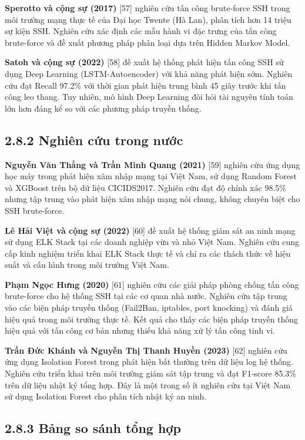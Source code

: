 \documentclass[
  a4paper]{report}
\begin{document}
\textbf{Sperotto và cộng sự (2017)} {[}57{]} nghiên cứu tấn công
brute-force SSH trong môi trường mạng thực tế của Đại học Twente (Hà
Lan), phân tích hơn 14 triệu sự kiện SSH. Nghiên cứu xác định các mẫu
hành vi đặc trưng của tấn công brute-force và đề xuất phương pháp phân
loại dựa trên Hidden Markov Model.

\textbf{Satoh và cộng sự (2022)} {[}58{]} đề xuất hệ thống phát hiện tấn
công SSH sử dụng Deep Learning (LSTM-Autoencoder) với khả năng phát hiện
sớm. Nghiên cứu đạt Recall 97.2\% với thời gian phát hiện trung bình 45
giây trước khi tấn công leo thang. Tuy nhiên, mô hình Deep Learning đòi
hỏi tài nguyên tính toán lớn hơn đáng kể so với các phương pháp truyền
thống.

\subsection{2.8.2 Nghiên cứu trong
nước}\label{nghiuxean-cux1ee9u-trong-nux1b0ux1edbc}

\textbf{Nguyễn Văn Thắng và Trần Minh Quang (2021)} {[}59{]} nghiên cứu
ứng dụng học máy trong phát hiện xâm nhập mạng tại Việt Nam, sử dụng
Random Forest và XGBoost trên bộ dữ liệu CICIDS2017. Nghiên cứu đạt độ
chính xác 98.5\% nhưng tập trung vào phát hiện xâm nhập mạng nói chung,
không chuyên biệt cho SSH brute-force.

\textbf{Lê Hải Việt và cộng sự (2022)} {[}60{]} đề xuất hệ thống giám
sát an ninh mạng sử dụng ELK Stack tại các doanh nghiệp vừa và nhỏ Việt
Nam. Nghiên cứu cung cấp kinh nghiệm triển khai ELK Stack thực tế và chỉ
ra các thách thức về hiệu suất và cấu hình trong môi trường Việt Nam.

\textbf{Phạm Ngọc Hưng (2020)} {[}61{]} nghiên cứu các giải pháp phòng
chống tấn công brute-force cho hệ thống SSH tại các cơ quan nhà nước.
Nghiên cứu tập trung vào các biện pháp truyền thống (Fail2Ban, iptables,
port knocking) và đánh giá hiệu quả trong môi trường thực tế. Kết quả
cho thấy các biện pháp truyền thống hiệu quả với tấn công cơ bản nhưng
thiếu khả năng xử lý tấn công tinh vi.

\textbf{Trần Đức Khánh và Nguyễn Thị Thanh Huyền (2023)} {[}62{]} nghiên
cứu ứng dụng Isolation Forest trong phát hiện bất thường trên dữ liệu
log hệ thống. Nghiên cứu triển khai trên môi trường giám sát tập trung
và đạt F1-score 85.3\% trên dữ liệu nhật ký tổng hợp. Đây là một trong
số ít nghiên cứu tại Việt Nam sử dụng Isolation Forest cho phân tích
nhật ký an ninh.

\subsection{2.8.3 Bảng so sánh tổng
hợp}\label{bux1ea3ng-so-suxe1nh-tux1ed5ng-hux1ee3p}
\end{document}
